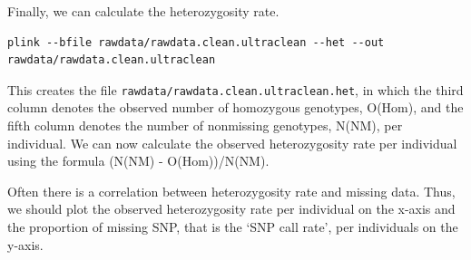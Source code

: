 \documentclass[
]{book}
\begin{document}
Finally, we can calculate the heterozygosity rate.

\begin{verbatim}
plink --bfile rawdata/rawdata.clean.ultraclean --het --out rawdata/rawdata.clean.ultraclean
\end{verbatim}

This creates the file \texttt{rawdata/rawdata.clean.ultraclean.het}, in which the third column denotes the observed number of homozygous genotypes, O(Hom), and the fifth column denotes the number of nonmissing genotypes, N(NM), per individual. We can now calculate the observed heterozygosity rate per individual using the formula (N(NM) - O(Hom))/N(NM).

Often there is a correlation between heterozygosity rate and missing data. Thus, we should plot the observed heterozygosity rate per individual on the x-axis and the proportion of missing SNP, that is the `SNP call rate', per individuals on the y-axis.
\end{document}

